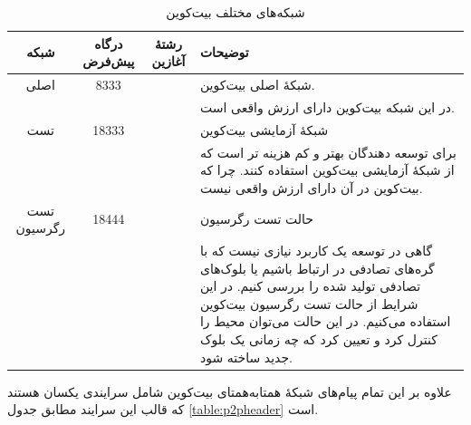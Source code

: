 \begin{xltabular}{\textwidth}{|c|c|c|X|}
	\caption{شبکه‌های مختلف بیت‌کوین\label{table:PortandString}}\\
	\hline
	\textbf{شبکه} & \textbf{درگاه پیش‌فرض} & \textbf{رشته‌ٔ آغازین} & \textbf{توضیحات} \\
	\hline \hline 
	اصلی & 8333 &  & {%
		شبکهٔ اصلی بیت‌کوین.
	}\\
	 & & & {%
		در این شبکه بیت‌کوین دارای ارزش واقعی است.
	} \\
	\hline
	تست & 18333 &  & {%
		شبکهٔ آزمایشی بیت‌کوین
	}\\
	 & & & {%
		برای توسعه دهندگان بهتر و کم هزینه‌ تر است که از شبکهٔ آزمایشی بیت‌کوین استفاده کنند. چرا که بیت‌کوین‌ در آن دارای ارزش واقعی نیست.
	} \\
	\hline
	تست رگرسیون & 18444 &  & {%
		حالت تست رگرسیون
	}\\
	 & & & {%
		گاهی در توسعه یک کاربرد نیازی نیست که با گره‌های تصادفی در ارتباط باشیم یا بلوک‌های تصادفی تولید شده را بررسی کنیم. در این شرایط از حالت تست رگرسیون بیت‌کوین استفاده می‌کنیم. در این حالت می‌توان محیط را کنترل کرد و تعیین کرد که چه زمانی یک بلوک جدید ساخته شود.
	} \\
	\hline
	
	
\end{xltabular}


علاوه بر این تمام پیام‌های شبکه‌ٔ همتا‌به‌همتای بیت‌کوین شامل سرایندی یکسان هستند که قالب این سرایند مطابق جدول \ref{table:p2pheader} است.

